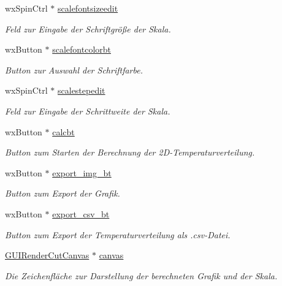 \begin{DoxyCompactItemize}
wx\-Spin\-Ctrl $\ast$ \hyperlink{classGUICutRenderWindow_a62cb232f5f9747c1fdbc5c1f6ff4b7a4}{scalefontsizeedit}
\begin{DoxyCompactList}\small\item\em Feld zur Eingabe der Schriftgröße der Skala. \end{DoxyCompactList}\item 
wx\-Button $\ast$ \hyperlink{classGUICutRenderWindow_a13a1557216de339d20189fdaa0df482b}{scalefontcolorbt}
\begin{DoxyCompactList}\small\item\em Button zur Auswahl der Schriftfarbe. \end{DoxyCompactList}\item 
wx\-Spin\-Ctrl $\ast$ \hyperlink{classGUICutRenderWindow_a4fbe9115e418be48a70eff31e94640ba}{scalestepedit}
\begin{DoxyCompactList}\small\item\em Feld zur Eingabe der Schrittweite der Skala. \end{DoxyCompactList}\item 
wx\-Button $\ast$ \hyperlink{classGUICutRenderWindow_a7cadc8f5fd1b153ba21aa82fd5f70eff}{calcbt}
\begin{DoxyCompactList}\small\item\em Button zum Starten der Berechnung der 2\-D-\/\-Temperaturverteilung. \end{DoxyCompactList}\item 
wx\-Button $\ast$ \hyperlink{classGUICutRenderWindow_ac0b26b746d6339154256d81da8cd7aed}{export\-\_\-img\-\_\-bt}
\begin{DoxyCompactList}\small\item\em Button zum Export der Grafik. \end{DoxyCompactList}\item 
wx\-Button $\ast$ \hyperlink{classGUICutRenderWindow_a1613155eefe8309903858f9427b263de}{export\-\_\-csv\-\_\-bt}
\begin{DoxyCompactList}\small\item\em Button zum Export der Temperaturverteilung als .csv-\/\-Datei. \end{DoxyCompactList}\item 
\hyperlink{classGUIRenderCutCanvas}{G\-U\-I\-Render\-Cut\-Canvas} $\ast$ \hyperlink{classGUICutRenderWindow_abbaa6c66e8aa9fee96ba20a9a29e1a18}{canvas}
\begin{DoxyCompactList}\small\item\em Die Zeichenfläche zur Darstellung der berechneten Grafik und der Skala. \end{DoxyCompactList}\item 

\end{DoxyCompactItemize}
